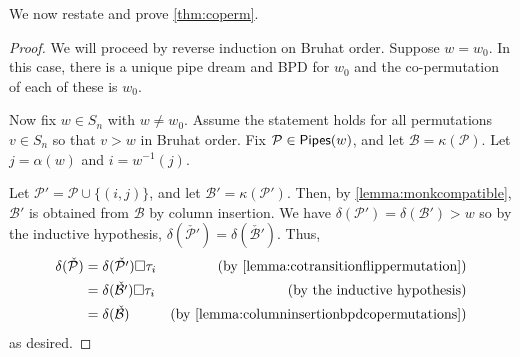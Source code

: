 \documentclass[12 pt]{amsart}
\newcommand{\addable}{\alpha}
\numberwithin{equation}{section}
\theoremstyle{remark}
\newcommand{\pipes}{{\sf Pipes}}
\newcommand{\demprod}{\delta}
\begin{document}
		We now restate and prove \cref{thm:coperm}.
		\coperm*
		\begin{proof}
			We will proceed by reverse induction on Bruhat order. Suppose $w=w_0$. In this case, there is a unique pipe dream and BPD for $w_0$ and the co-permutation of each of these is $w_0$.
			
			Now fix $w \in S_n$ with $w \neq w_0$. 
			Assume the statement holds for all permutations $v \in S_n$ so that $v > w$ in Bruhat order. 
			Fix $\mathcal{P} \in \pipes(w)$, and let $\mathcal{B} = \kappa(\mathcal{P})$. Let $j = \addable(w)$ and $i = w^{-1}(j)$. 
			
			Let $\mathcal{P}' = \mathcal{P} \cup \{(i, j)\}$, and let $\mathcal{B}' = \kappa(\mathcal{P}')$. Then, by \cref{lemma:monkcompatible}, $\mathcal{B}'$ is obtained from $\mathcal{B}$ by column insertion.
			We have $\demprod(\mathcal{P}') = \demprod(\mathcal{B}') > w$ so by the inductive hypothesis, $\demprod(\check{\mathcal{P}'}) = \demprod(\check{\mathcal{B}'})$.
			Thus,
			\begin{align*}
				\demprod(\check{\mathcal{P}})
				& = \demprod(\check{\mathcal{P'}}) \square \tau_i &\text{(by \cref{lemma:cotransitionflippermutation})}\\
				& = \demprod(\check{\mathcal{B'}}) \square \tau_i &\text{(by the inductive hypothesis)}\\
				& = \demprod(\check{\mathcal{B}}) & \text{(by \cref{lemma:columninsertionbpdcopermutations})}
			\end{align*}
			as desired.
		\end{proof}
		
\end{document}
